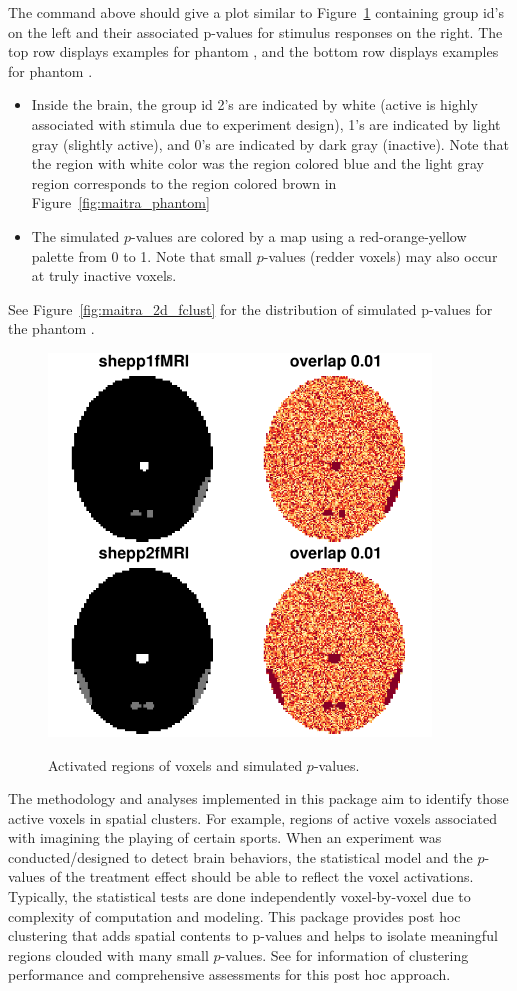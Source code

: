 The command above should give a plot similar to Figure~\ref{fig:maitra_2d}
containing group id's on the left and their associated
p-values for stimulus responses on the right.
The top row displays examples for phantom , and the
bottom row displays examples for phantom .
\begin{itemize}
\item
Inside the brain,
the group id 2's are indicated by white (active is highly associated with
stimula due to experiment design),
1's are indicated by light gray (slightly active),
and 0's are indicated by dark gray (inactive).
Note that the region with white color was the region colored  blue
and the light gray region corresponds to the region colored brown in
Figure~\ref{fig:maitra_phantom} 
\item
The simulated $p$-values are colored by a map using  a
red-orange-yellow palette from 0 to 1.
Note that small $p$-values (redder voxels) may also occur at truly inactive voxels.
\end{itemize}
See Figure~\ref{fig:maitra_2d_fclust} for the distribution of
simulated p-values for the phantom .

\begin{figure}[h]
\caption{Activated regions of voxels and simulated $p$-values.}
\centering
\vspace{0.2cm}
\includegraphics[width=4in]{./MixfMRI-include/maitra_2d}
\label{fig:maitra_2d}
\end{figure}

The methodology and analyses implemented in this package aim to 
identify those active voxels in spatial clusters. For example,
regions of active voxels associated with imagining the playing of certain
sports. 
When an experiment was conducted/designed to detect brain behaviors,
the statistical model and the $p$-values of the treatment effect
should be able to reflect the voxel activations.
Typically, the statistical tests are done independently voxel-by-voxel
due to complexity of computation and modeling.
This package provides post hoc clustering that adds spatial contents
to p-values and helps to isolate meaningful regions
clouded with many small $p$-values.
See \cite{ChenMaitra2018} for information of clustering performance and
comprehensive assessments for this post hoc approach.


